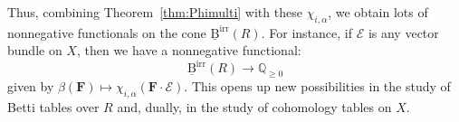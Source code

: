 \documentclass[12pt]{amsart}
\theoremstyle{definition}
\theoremstyle{remark}
\newcommand{\QQ}{\mathbb{Q}}
\newcommand{\cE}{\mathcal{E}}
\newcommand{\FF}{\mathbf{F}}
\newcommand{\BBirr}{\underline{\mathrm{B}}^{\text{irr}}}
\begin{document}
Thus, combining Theorem~\ref{thm:Phimulti} with these $\chi_{i,\alpha}$, we obtain lots of nonnegative functionals on the cone $\BBirr(R)$.  For instance, if $\cE$ is any vector bundle on $X$, then we have a nonnegative functional:
\[
\BBirr(R)\to \QQ_{\geq 0}
\]
given by $\beta(\FF)\mapsto \chi_{i,\alpha}(\FF\cdot \cE)$.  This opens up new possibilities in the study of Betti tables over $R$ and, dually, in the study of cohomology tables on $X$.


\end{document}
